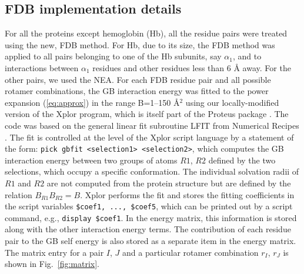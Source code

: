 \documentclass[a4paper,12pt]{article}
\begin{document}
\subsection{FDB implementation details}
For all the proteins except hemoglobin (Hb), all the residue pairs were treated using the new, FDB method. For Hb, due to
its size, the FDB method was applied to all pairs belonging to one of the Hb subunits, say $\alpha_1$, and to interactions
between $\alpha_1$ residues and other residues less than 6 {\AA} away. For the other pairs, we used the NEA. For each FDB
residue pair and all possible rotamer combinations, the GB interaction energy was fitted to the power expansion
(\ref{eq:approx}) in the range B=1--150 {\AA}$^2$ using our locally-modified version of the Xplor program, which is itself
part of the Proteus package \cite{Simonson13b}. The code was based on the general linear fit subroutine LFIT from Numerical
Recipes \cite{PressBK,Archontis05b}. The fit is controlled at the level of the Xplor script language \cite{Xplor} by a
statement of the form: \verb_pick gbfit <selection1> <selection2>_, which computes the GB interaction energy between
two groups of atoms $R1$, $R2$ defined by the two selections, which occupy a specific conformation. The individual solvation
radii of $R1$ and $R2$ are not computed from the protein structure but are defined by the relation $B_{R1} B_{R2} = B$.
Xplor performs the fit and stores the fitting coefficients in the script variables \verb_$coef1, ..., $coef5_, which can
be printed out by a script command, e.g., \verb_display $coef1_. In the energy matrix, this information is stored along
with the other interaction energy terms. The contribution of each residue pair to the GB self energy is also stored as a
separate item in the energy matrix. The matrix entry for a pair $I$, $J$ and a particular rotamer combination $r_I$, $r_J$
is shown in Fig.\ \ref{fig:matrix}.
\end{document}
